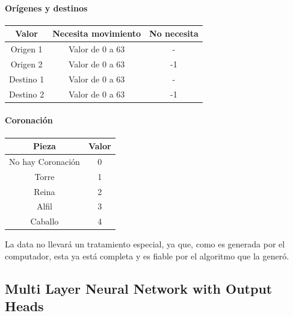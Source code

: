 \paragraph{Orígenes y destinos}
\begin{center}
\begin{tabular}{|c|c|c|}
\hline
\textbf{Valor} & \textbf{Necesita movimiento} & \textbf{No necesita} \\ \hline
Origen 1    & Valor de 0 a 63 & -\\ \hline
Origen 2    & Valor de 0 a 63 & -1\\\hline
Destino 1   & Valor de 0 a 63 & -\\\hline
Destino 2   & Valor de 0 a 63 & -1\\\hline
\end{tabular}
\end{center}
\paragraph{Coronación}
\begin{center}
    \begin{tabular}{|c|c|}
    \hline
    \textbf{Pieza} & \textbf{Valor} \\ \hline
    No hay Coronación & 0\\ \hline
    Torre  & 1 \\\hline
    Reina   & 2 \\\hline
    Alfil   & 3 \\\hline
    Caballo   & 4 \\\hline
    \end{tabular}    
\end{center}

La data no llevará un tratamiento especial, ya que, como es generada por el computador, esta ya está completa y es fiable por el algoritmo que la generó.

\subsection{Multi Layer Neural Network with Output Heads}


